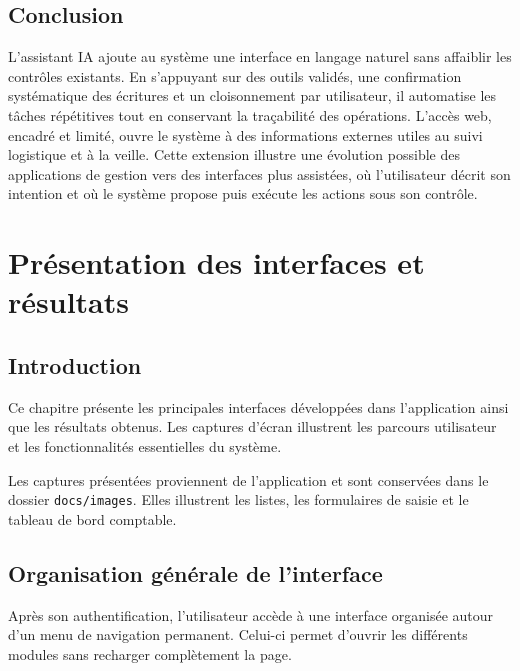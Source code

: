 \documentclass[12pt,a4paper,oneside]{report}
\newcommand{\code}[1]{\texttt{#1}}
\newif\ifshowmissingfigures
\begin{document}
\section*{Conclusion}
L'assistant IA ajoute au système une interface en langage naturel sans affaiblir les contrôles existants. En s'appuyant sur des outils validés, une confirmation systématique des écritures et un cloisonnement par utilisateur, il automatise les tâches répétitives tout en conservant la traçabilité des opérations. L'accès web, encadré et limité, ouvre le système à des informations externes utiles au suivi logistique et à la veille. Cette extension illustre une évolution possible des applications de gestion vers des interfaces plus assistées, où l'utilisateur décrit son intention et où le système propose puis exécute les actions sous son contrôle.

\chapter{Présentation des interfaces et résultats}
\label{chap:interfaces}
\showmissingfiguresfalse

\section*{Introduction}

Ce chapitre présente les principales interfaces développées dans
l'application ainsi que les résultats obtenus. Les captures d'écran
illustrent les parcours utilisateur et les fonctionnalités essentielles
du système.

Les captures présentées proviennent de l’application et sont conservées dans le dossier \code{docs/images}. Elles illustrent les listes, les formulaires de saisie et le tableau de bord comptable.

\section{Organisation générale de l'interface}

Après son authentification, l'utilisateur accède à une interface organisée
autour d'un menu de navigation permanent. Celui-ci permet d'ouvrir les
différents modules sans recharger complètement la page.
\end{document}
